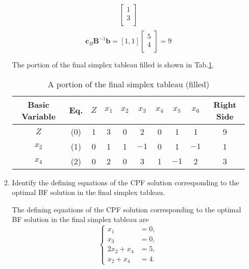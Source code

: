 \documentclass[a4paper]{article}
\begin{document}
\begin{enumerate}
\begin{enumerate}
\begin{solution}
\begin{equation*}
\begin{aligned}
\begin{bmatrix}
		1\\
		3\\
		\end{bmatrix}\\
		\end{aligned}		
		\end{equation*}
		\begin{equation*}
		\mathbf{c}_B\mathbf{B}^{-1}\mathbf{b}
		=[1,1]\begin{bmatrix}
		5\\
		4\\
		\end{bmatrix}
		=9
		\end{equation*}
		
		The portion of the final simplex tableau filled is shown in Tab.\ref{tab6}.
		\begin{table}[h]
			\centering
			\caption{A portion of the final simplex tableau (filled)}
			\label{tab6}
			\begin{tabular}{cccccccccc}
				\toprule[1.5pt]
				Basic Variable    &Eq.  &$Z$  &$x_1$&$x_2$&$x_3$&$x_4$&$x_5$&$x_6$&Right Side\\
				\midrule[0.5pt]
				$Z$     &(0)  &1  &3      &0      &2       &0       &1       &1       &9\\
				$x_2$  &(1)  &0  &1      & 1     &$-1$     &0       &1       &$-1$      &1\\
				$x_4$  &(2)  &0  &2      &0      &3      &1       &$-1$      &2       &3\\
				
				\bottomrule[1.5pt]
			\end{tabular}
		\end{table}		
	\end{solution}
	
	\vspace*{-0.2cm}
	\item Identify the defining equations of the CPF solution corresponding to the optimal BF solution in the final simplex tableau.
	\begin{solution}
		
		The defining equations of the CPF solution corresponding to the optimal BF solution in the final simplex tableau are
		\begin{equation*}
		\left\{\begin{aligned}
		x_1&=0,\\
		x_3&=0,\\
		2x_2+x_4&=5,\\
		x_2+x_4&=4.
		\end{aligned}
		\right.
		\end{equation*}
		
	\end{solution}
	
\end{enumerate}


\end{enumerate}
%  
\end{document}
